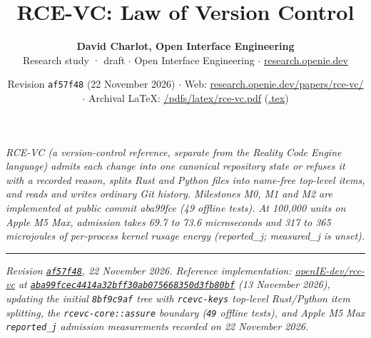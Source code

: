 \documentclass[10pt,letterpaper]{article}
\title{\vspace{-1.2em}\textbf{RCE-VC: Law of Version Control}}
\author{\textbf{David Charlot, Open Interface Engineering}\\[0.15em]
{\small Research study · draft $\cdot$ Open Interface Engineering $\cdot$ \href{https://research.openie.dev}{research.openie.dev}}}
\date{\small Revision \texttt{af57f48} (22 November 2026) $\cdot$ Web: \href{https://research.openie.dev/papers/rce-vc/}{research.openie.dev/papers/rce-vc/} $\cdot$ Archival LaTeX: \href{https://research.openie.dev/pdfs/latex/rce-vc.pdf}{/pdfs/latex/rce-vc.pdf} (\href{https://research.openie.dev/pdfs/latex/rce-vc.tex}{.tex})}
\begin{document}
\maketitle
\vspace{-0.6em}

\noindent{}

\vspace{6pt}
\hspace{8pt}%
\parbox{\dimexpr\linewidth-11pt\relax}{%
  \small\itshape\color{openieSlate}%
  RCE-VC (a version-control reference, separate from the Reality Code Engine language) admits each change into one canonical repository state or refuses it with a recorded reason, splits Rust and Python files into name-free top-level items, and reads and writes ordinary Git history. Milestones M0, M1 and M2 are implemented at public commit aba99fce (49 offline tests). At 100,000 units on Apple M5 Max, admission takes 69.7 to 73.6 microseconds and 317 to 365 microjoules of per-process kernel rusage energy (reported\_j; measured\_j is unset).
}
\vspace{6pt}

{
\small
\setcounter{tocdepth}{2}
\tableofcontents
}
\vspace{4pt}
\hrule
\vspace{8pt}

\emph{Revision
\href{https://github.com/openIE-dev/research-openie-web/commits/main/src/content/papers/rce-vc.md}{\texttt{af57f48}},
22 November 2026. Reference implementation:
\href{https://github.com/openIE-dev/rce-vc}{openIE-dev/rce-vc} at
\href{https://github.com/openIE-dev/rce-vc/tree/aba99fcec4414a32bff30ab075668350d3fb80bf}{\texttt{aba99fcec441\allowbreak{}4a32bff30ab0\allowbreak{}75668350d3fb80bf}}
(13 November 2026), updating the initial \texttt{8bf9c9af} tree with
\texttt{rcevc-keys} top-level Rust/Python item splitting, the
\texttt{rcevc-\allowbreak{}core::assure} boundary (\texttt{49} offline tests), and
Apple M5 Max \texttt{reported\_j} admission measurements recorded on 22
November 2026.}
\end{document}
